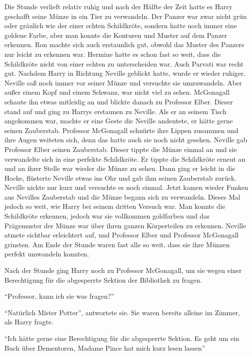 Die Stunde verlieft relativ ruhig und nach der Hälfte der Zeit hatte es Harry geschafft seine Münze in ein Tier zu verwandeln. Der Panzer war zwar nicht grün oder gräulich wie der einer echten Schildkröte, sondern hatte noch immer eine goldene Farbe, aber man konnte die Konturen und Muster auf dem Panzer erkennen. Ron machte sich auch erstaunlich gut, obwohl das Muster des Panzers nur leicht zu erkennen war. Hermine hatte es schon fast so weit, dass die Schildkröte nicht von einer echten zu unterscheiden war. Auch Parvati war recht gut. Nachdem Harry in Richtung Neville geblickt hatte, wurde er wieder ruhiger. Neville saß noch immer vor seiner Münze und versuchte sie umzuwandeln. Aber außer einem Kopf und einem Schwanz, war nicht viel zu sehen. McGonagall schaute ihn etwas mitleidig an und blickte danach zu Professor Elber. Dieser stand auf und ging zu Harrys erstaunen zu Neville. Als er an seinem Tisch angekommen war, machte er eine Geste die Neville andeutete, er hätte gerne seinen Zauberstab. Professor McGonagall schnürte ihre Lippen zusammen und ihre Augen weiteten sich, denn das hatte auch sie noch nicht gesehen. Neville gab Professor Elber seinen Zauberstab. Dieser tippte die Münze einmal an und sie verwandelte sich in eine perfekte Schildkröte. Er tippte die Schildkröte erneut an und an ihrer Stelle war wieder die Münze zu sehen. Dann ging er leicht in die Hocke, flüsterte Neville etwas ins Ohr und gab ihm seinen Zauberstab zurück. Neville nickte nur kurz und versuchte es noch einmal. Jetzt kamen wieder Funken aus Nevilles Zauberstab und die Münze begann sich zu verwandeln. Dieses Mal jedoch so weit, wie Harry bei seinem dritten Versuch war. Man konnte die Schildkröte erkennen, jedoch war sie vollkommen goldfarben und das Prägemuster der Münze war über ihren ganzen Körperteilen zu erkennen. Neville atmete sichtbar erleichtert auf, und Professor Elber und Professor McGonagall grinsten. Am Ende der Stunde waren fast alle so weit, dass sie ihre Münzen perfekt umwandeln konnten.

Nach der Stunde ging Harry noch zu Professor McGonagall, um sie wegen einer Berechtigung für die abgesperrte Sektion der Bibliothek zu fragen.

\enquote{Professor, kann ich sie was fragen?}

\enquote{Natürlich Mister Potter}, antwortete sie. Sie waren bereits alleine im Zimmer, als Harry fragte.

\enquote{Ich hätte gerne eine Berechtigung für die abgesperrte Sektion. Es geht um ein Buch über Dementoren, Madame Pince hat mich kurz lesen lassen\abs}

